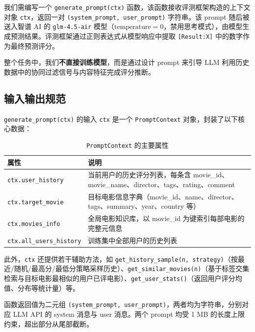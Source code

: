 \documentclass[UTF8,a4paper,10pt,fontset=none]{ctexart}
\begin{document}
我们需编写一个 \texttt{generate\_prompt(ctx)} 函数，该函数接收评测框架构造的上下文对象 \texttt{ctx}，返回一对 \texttt{(system\_prompt, user\_prompt)} 字符串。该 prompt 随后被送入智谱 AI 的 \texttt{glm-4.5-air} 模型（$\text{temperature}=0$，禁用思考模式），由模型生成预测结果。评测框架通过正则表达式从模型响应中提取 \texttt{[Result:X]} 中的数字作为最终预测评分。

整个任务中，我们\textbf{不直接训练模型}，而是通过设计 prompt 来引导 LLM 利用历史数据中的协同过滤信号与内容特征完成评分推断。

\subsection{输入输出规范}

\texttt{generate\_prompt(ctx)} 的输入 \texttt{ctx} 是一个 \texttt{PromptContext} 对象，封装了以下核心数据：

\begin{table}[htbp]
    \centering
    \setlength{\tabcolsep}{8pt}
    \caption{\texttt{PromptContext} 的主要属性}
    \label{tab:ctx}
    \small
    \begin{tabular}{@{}p{}p{}@{}}
        \toprule
        \textbf{属性} & \textbf{说明} \\
        \midrule
        \texttt{ctx.user\_history} & 当前用户的历史评分列表，每条含 movie\_id、movie\_name、director、tags、rating、comment \\
        \texttt{ctx.target\_movie}  & 目标电影信息字典（movie\_id、name、director、tags、summary、year、country 等） \\
        \texttt{ctx.movies\_info}   & 全局电影知识库，以 movie\_id 为键索引每部电影的完整元信息 \\
        \texttt{ctx.all\_users\_history} & 训练集中全部用户的历史列表 \\
        \bottomrule
    \end{tabular}
\end{table}

此外，\texttt{ctx} 还提供若干辅助方法，如 \texttt{get\_history\_sample(n, strategy)}（按最近/随机/最高分/最低分策略采样历史）、\texttt{get\_similar\_movies(n)}（基于标签交集检索与目标电影最相似的用户已评电影）、\texttt{get\_user\_stats()}（返回用户评分均值、分布等统计量）等。

函数返回值为二元组 \texttt{(system\_prompt, user\_prompt)}，两者均为字符串，分别对应 LLM API 的 system 消息与 user 消息。两个 prompt 均受 1 MB 的长度上限约束，超出部分从尾部截断。
\end{document}
